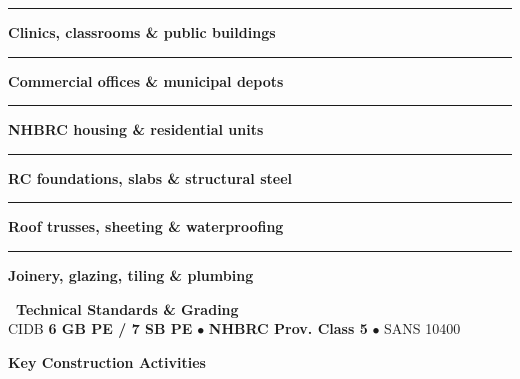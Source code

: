 \documentclass[a4paper,11pt]{article}
\begin{document}
\begin{minipage}[t]{0.34\textwidth}
    \vspace{0pt}
    \begin{tcolorbox}[
        enhanced, colback=mhoffwhite, colframe=mhnavy, boxrule=0.9pt, arc=4pt,
        title={\bfseries\color{white}\faBuilding\ Scope of Work},
        colbacktitle=mhnavy, left=7pt, right=7pt, top=5pt, bottom=5pt, drop shadow=black!5
    ]
        \fontsize{7.8pt}{10.8pt}\selectfont
        \textcolor{mhnavy}{\rule{3.5pt}{3.5pt}}\hspace{4pt}\textbf{Clinics, classrooms \& public buildings}\\
        \textcolor{mhnavy}{\rule{3.5pt}{3.5pt}}\hspace{4pt}\textbf{Commercial offices \& municipal depots}\\
        \textcolor{mhnavy}{\rule{3.5pt}{3.5pt}}\hspace{4pt}\textbf{NHBRC housing \& residential units}\\
        \textcolor{mhnavy}{\rule{3.5pt}{3.5pt}}\hspace{4pt}\textbf{RC foundations, slabs \& structural steel}\\
        \textcolor{mhnavy}{\rule{3.5pt}{3.5pt}}\hspace{4pt}\textbf{Roof trusses, sheeting \& waterproofing}\\
        \textcolor{mhnavy}{\rule{3.5pt}{3.5pt}}\hspace{4pt}\textbf{Joinery, glazing, tiling \& plumbing}
    \end{tcolorbox}

    \vspace{0.12cm}

    \begin{tcolorbox}[
        enhanced, colback=white, colframe=mhlightgray, boxrule=0.8pt, arc=4pt,
        left=6pt, right=6pt, top=5pt, bottom=5pt, drop shadow=black!3
    ]
        {\fontsize{7.5pt}{9.6pt}\selectfont\bfseries\color{mhnavy}\faCheckDouble\ Technical Standards \& Grading}\\[2pt]
        {\fontsize{7.3pt}{9.4pt}\selectfont\color{mhtextmuted}
        CIDB \textbf{6 GB PE / 7 SB PE} $\bullet$ \textbf{NHBRC Prov. Class 5} $\bullet$ SANS 10400}
    \end{tcolorbox}
\end{minipage}

\vfill

{\large\bfseries\color{mhnavy} Key Construction Activities}
\vspace{0.10cm}
\end{document}
